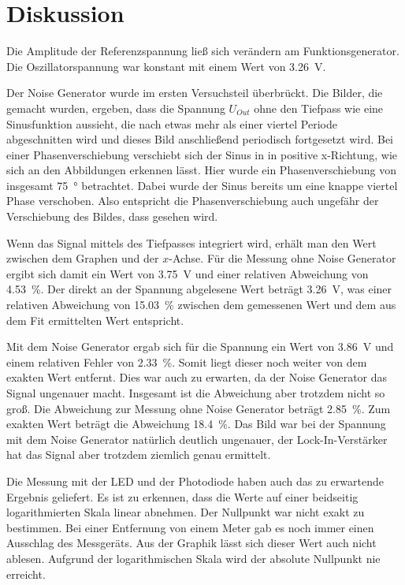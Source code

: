 \section{Diskussion}
\label{sec:Diskussion}

Die Amplitude der Referenzspannung ließ sich verändern am Funktionsgenerator. Die Oszillatorspannung war konstant mit einem Wert von \SI{3.26}{\V}. 

\noindent Der Noise Generator wurde im ersten Versuchsteil überbrückt. Die Bilder, die gemacht wurden, ergeben, dass die Spannung $U_{Out}$ ohne den Tiefpass wie eine Sinusfunktion aussieht, die nach etwas mehr als einer viertel Periode abgeschnitten wird und dieses Bild anschließend periodisch fortgesetzt wird. 
Bei einer Phasenverschiebung verschiebt sich der Sinus in in positive x-Richtung, wie sich an den Abbildungen erkennen lässt. Hier wurde ein Phasenverschiebung von insgesamt \SI{75}{\degree} betrachtet. Dabei wurde der Sinus bereits um eine knappe viertel Phase verschoben. Also entspricht die Phasenverschiebung auch ungefähr der Verschiebung des Bildes, dass gesehen wird. 

\noindent Wenn das Signal mittels des Tiefpasses integriert wird, erhält man den Wert zwischen dem Graphen und der $x$-Achse. Für die Messung ohne Noise Generator ergibt sich damit ein Wert von \SI{3.75}{\volt} und einer relativen Abweichung von \SI{4.53}{\percent}. Der direkt an der Spannung  abgelesene Wert beträgt \SI{3.26}{\volt}, was einer relativen Abweichung von  \SI{15.03}{\percent} zwischen dem gemessenen Wert und dem aus dem Fit ermittelten Wert entspricht. 

\noindent Mit dem Noise Generator ergab sich für die Spannung ein Wert von \SI{3.86}{\volt} und einem relativen Fehler von \SI{2.33}{\percent}. Somit liegt dieser noch weiter von dem exakten Wert entfernt. Dies war auch zu erwarten, da der Noise Generator das Signal ungenauer macht. Insgesamt ist die Abweichung aber trotzdem nicht so groß. Die Abweichung zur Messung ohne Noise Generator beträgt \SI{2.85}{\percent}. Zum exakten Wert beträgt die Abweichung \SI{18.4}{\percent}. Das Bild war bei der Spannung mit dem Noise Generator natürlich deutlich ungenauer, der Lock-In-Verstärker hat das Signal aber trotzdem ziemlich genau ermittelt. 

\noindent Die Messung mit der LED und der Photodiode haben auch das zu erwartende Ergebnis geliefert. Es ist zu erkennen, dass die Werte auf einer beidseitig logarithmierten Skala linear abnehmen. Der Nullpunkt war nicht exakt zu bestimmen. Bei einer Entfernung von einem Meter gab es noch immer einen Ausschlag des Messgeräts. Aus der Graphik lässt sich dieser Wert auch nicht ablesen. Aufgrund der logarithmischen Skala wird der absolute Nullpunkt nie erreicht.  
